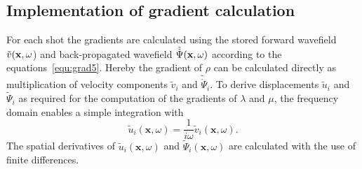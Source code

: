\subsection{Implementation of gradient calculation}
For each shot the  gradients are calculated using the stored forward wavefield $\tilde{v}(\textbf x,\omega$) and back-propagated wavefield $\tilde{\dot\Psi}(\textbf x,\omega)$ according to the equations~\ref{equ:grad5}. Hereby the gradient of $\rho$ can be calculated directly as multiplication of velocity components $\tilde{v}_i$ and $\tilde{\dot\Psi}_i$. To derive displacements $\tilde{u}_i$ and $\tilde{\Psi}_i$ as required for the computation of the gradients of $\lambda$ and $\mu$, the frequency domain enables a simple integration with 
\begin{equation}\tilde{u}_i(\textbf{x},\omega)=\frac{1}{i\omega}\tilde{v}_i(\textbf{x},\omega).\label{equ:u_vs_v}\end{equation}
The spatial derivatives of $\tilde{u}_i(\textbf{x},\omega)$ and $\tilde{\Psi}_i(\textbf{x},\omega)$ are calculated with the use of finite differences. 
